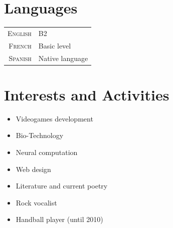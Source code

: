 \documentclass[a4paper,10pt]{article} %
\begin{document}

\section{Languages}

\begin{tabular}{r|p{11cm}}
\textsc{English} & B2\\
\textsc{French} & Basic level\\
\textsc{Spanish} & Native language\\
\end{tabular}


\section{Interests and Activities}

\begin{itemize}
  \item Videogames development
  \item Bio-Technology
  \item Neural computation
  \item Web design
  \item Literature and current poetry
  \item Rock vocalist
  \item Handball player (until 2010)
\end{itemize}
\end{document}
